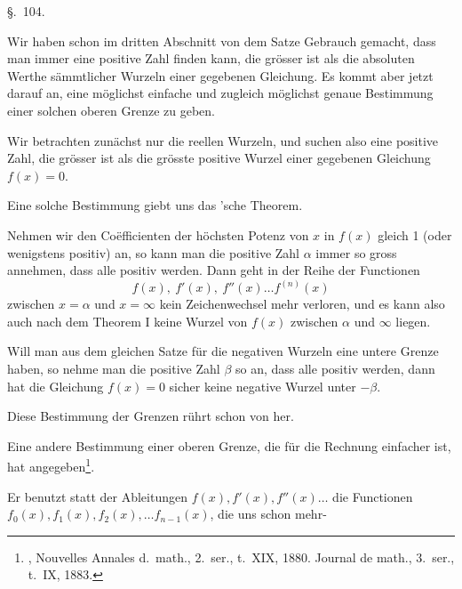 
\begin{center}
\S.\ 104.

\end{center}

Wir haben schon im dritten Abschnitt von dem Satze Gebrauch gemacht, dass
man immer eine positive Zahl finden kann, die grösser ist als die
absoluten Werthe sämmtlicher Wurzeln einer gegebenen Gleichung. Es kommt
aber jetzt darauf an, eine möglichst einfache und zugleich möglichst
genaue Bestimmung einer solchen oberen Grenze zu geben.

Wir betrachten zunächst nur die reellen Wurzeln, und suchen also eine
positive Zahl, die grösser ist als die grösste positive Wurzel einer
gegebenen Gleichung $f(x)=0$.

Eine solche Bestimmung giebt uns das 'sche Theorem.

Nehmen wir den Co\"efficienten der höchsten Potenz von $x$ in $f(x)$
gleich 1 (oder wenigstens positiv) an, so kann man die positive Zahl
$\alpha$ immer so gross annehmen, dass
alle positiv werden. Dann geht in der Reihe der Functionen
\[
f(x),\ f'(x),\ f''(x)\ldots f^{(n)}(x)
\]
zwischen $x=\alpha$ und $x=\infty$ kein Zeichenwechsel mehr verloren, und
es kann also auch nach dem Theorem I keine Wurzel von $f(x)$ zwischen
$\alpha$ und $\infty$ liegen.

Will man aus dem gleichen Satze für die negativen Wurzeln eine untere
Grenze haben, so nehme man die positive Zahl $\beta$ so an, dass
alle positiv werden, dann hat die Gleichung $f(x)=0$ sicher keine
negative Wurzel unter $-\beta$.

Diese Bestimmung der Grenzen rührt schon von  her.

Eine andere Bestimmung einer oberen Grenze, die für die Rechnung
einfacher ist, hat  angegeben\footnote{,
Nouvelles Annales d.\ math., 2.\ ser., t.\ XIX, 1880. Journal de math.,
3.\ ser., t.\ IX, 1883.}.

Er benutzt statt der Ableitungen $f(x), f'(x), f''(x)\ldots$ die
Functionen $f_0(x), f_1(x), f_2(x), \ldots f_{n-1}(x)$, die uns schon mehr-

